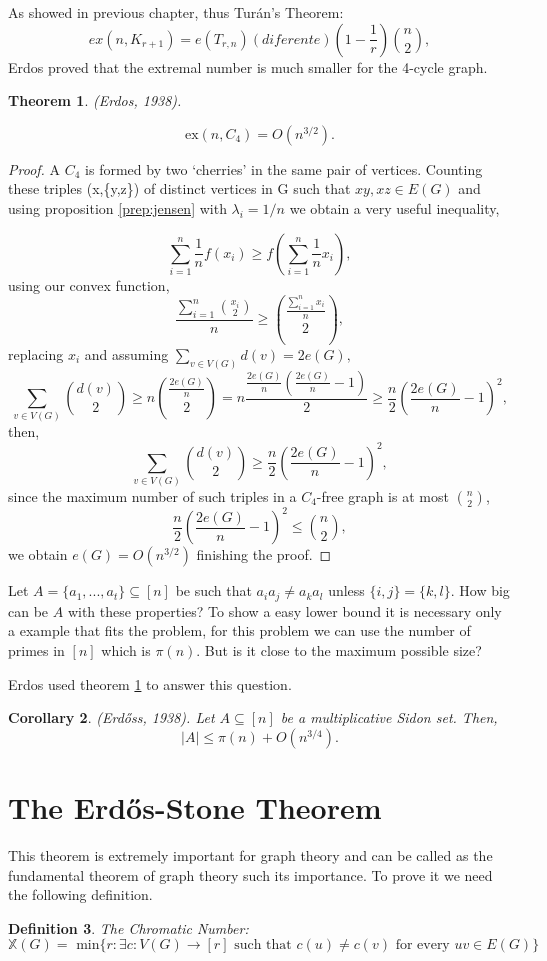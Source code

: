 \documentclass[12pt,twoside,a4paper]{book}
\numberwithin{equation}{section}
\let\subset\subseteq
\newtheorem{theorem}             {Theorem}[section]
\newtheorem{definition}	[theorem] {Definition}
\newtheorem{corollary}	[theorem] {Corollary}
\theoremstyle{remark}
\begin{document}
As showed in previous chapter, thus Turán's Theorem:
$$ ex(n,K_{r+1}) = e(T_{r,n}) (diferente) \left( 1-\frac{1}{r}\right) \binom{n}{2} ,$$
Erdos proved that the extremal number is much smaller for the 4-cycle graph.
 
\begin{theorem} \label{theorem: Erdos,1938}
(Erdos, 1938).

$$\text{ex}(n,C_4) = O(n^{3/2}).$$
\end{theorem}

\begin{proof}
A $C_4$ is formed by two `cherries' in the same pair of vertices. Counting these triples (x,\{y,z\}) of distinct vertices in G such that $xy, xz \in E(G)$ and using proposition \ref{prep:jensen} with $\lambda_i = 1/n$ we obtain a very useful inequality,

$$ \sum_{i=1}^n \frac{1}{n} f\left(x_i\right) \geq f\left(\sum_{i=1}^n \frac{1}{n} x_i\right),$$
using our convex function,
$$ \frac{\sum_{i=1}^n \binom{x_i}{2}}{n} \geq \binom{\frac{\sum_{i=1}^n x_i}{n}}{2} ,$$
replacing $x_i$ and assuming $\sum_{v \in V(G)} d(v) = 2e(G),$
$$ \sum_{v \in V(G)} \binom{d(v)}{2} \geq n \binom{\frac{2e(G)}{n}}{2}= n\frac{\frac{2e(G)}{n}\left( \frac{2e(G)}{n}-1\right)}{2} \geq \frac{n}{2} \left( \frac{2e(G)}{n} - 1 \right)^2,$$
then,
$$\sum_{v \in V(G)} \binom{d(v)}{2} \geq \frac{n}{2} \left( \frac{2e(G)}{n} - 1 \right)^2,$$
since the maximum number of such triples in a $C_4$-free graph is at most $\binom{n}{2}$,
$$ \frac{n}{2}\left(\frac{2e(G)}{n} - 1\right)^2 \leq \binom{n}{2},$$
we obtain $e(G) = O(n^{3/2})$ finishing the proof.
\end{proof}

Let $A = \{a_1,...,a_t\} \subset [n]$ be such that $a_ia_j \neq a_ka_l$ unless $\{i,j\} = \{k,l\}$. How big can be $A$ with these properties?
To show a easy lower bound it is necessary only a example that fits the problem, for this problem we can use the number of primes in $[n]$ which is $\pi (n)$. But is it close to the maximum possible size?

Erdos used theorem \ref{theorem: Erdos,1938} to answer this question.

\begin{corollary}(Erd\H{o}ss, 1938). Let $A\subseteq [n]$ be a multiplicative Sidon set. Then,
$$ |A| \leq \pi(n) + O(n^{3/4}). $$

\end{corollary}

\section{The Erd\H{o}s-Stone Theorem}
This theorem is extremely important for graph theory and can be called as the fundamental theorem of graph theory such its importance. To prove it we need the following definition.
\begin{definition} The Chromatic Number:
$$\mathbb{X}(G) = \text{ min}\{r: \exists c : V(G) \rightarrow [r] \text{ such that } c(u) \neq c(v) \text{ for every } uv \in E(G)\}$$ 
\end{definition}
\end{document}
